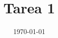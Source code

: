 \documentclass[10pt,oneside]{article}
\author{} %
\title{Tarea 1}
\date{\today}
\begin{document}
\maketitle
\thispagestyle{fancy} %

\nocite{Ross2012}
\printbibliography
\end{document}
